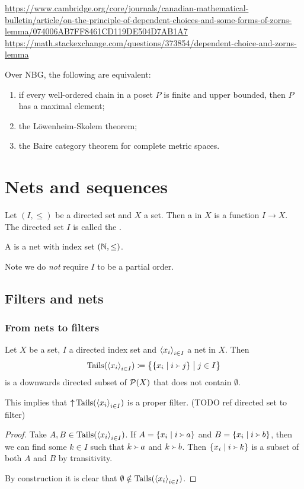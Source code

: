 \url{https://www.cambridge.org/core/journals/canadian-mathematical-bulletin/article/on-the-principle-of-dependent-choices-and-some-forms-of-zorns-lemma/074006AB7FF8461CD119DE504D7AB1A7}
\url{https://math.stackexchange.com/questions/373854/dependent-choice-and-zorns-lemma}

\begin{proposition}
Over NBG, the following are equivalent:
\begin{enumerate}
\item if every well-ordered chain in a poset $P$ is finite and upper bounded, then $P$ has a maximal element;
\item the Löwenheim-Skolem theorem;
\item the Baire category theorem for complete metric spaces.
\end{enumerate}
\end{proposition}


\section{Nets and sequences}
\begin{definition}
Let $(I,\leq)$ be a directed set and $X$ a set. Then a  in $X$ is a function $I\to X$. The directed set $I$ is called the .

A  is a net with index set $\sSet{\N, \leq}$.
\end{definition}
Note we do \emph{not} require $I$ to be a partial order.

\subsection{Filters and nets}
\subsubsection{From nets to filters}
\begin{lemma} \label{tailsDownwardsDirected}
Let $X$ be a set, $I$ a directed index set and $\left\langle x_i \right\rangle_{i\in I}$ a net in $X$. Then
\[ \Tails(\seq{x_i}_{i\in I}) \defeq \setbuilder[\big]{\setbuilder{x_i}{i \Yright j}}{j\in I} \]
is a downwards directed subset of $\operatorname{\mathcal{P}}(X)$ that does not contain $\emptyset$.
\end{lemma}
This implies that $\operatorname{\uparrow} \operatorname{Tails}(\left\langle x_i \right\rangle_{i\in I})$ is a proper filter. (TODO ref directed set to filter)
\begin{proof}
Take $A,B\in \operatorname{Tails}(\left\langle x_i \right\rangle_{i\in I})$. If $A = \setbuilder{x_i}{i \Yright a}$ and $B = \setbuilder{x_i}{i \Yright b}$, then we can find some $k\in I$ such that $k \Yright a$ and $k\Yright b$. Then $\setbuilder{x_i}{i \Yright k}$ is a subset of both $A$ and $B$ by transitivity.

By construction it is clear that $\emptyset \notin \operatorname{Tails}(\left\langle x_i \right\rangle_{i\in I})$.
\end{proof}

